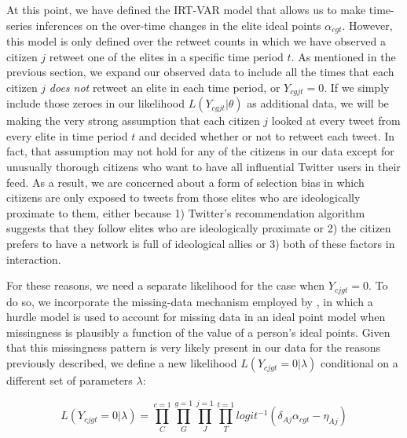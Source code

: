 \documentclass[12pt]{article}
\begin{document}
At this point, we have defined the IRT-VAR model that allows us to make time-series inferences on the over-time changes in the elite ideal points $\alpha_{cgt}$. However, this model is only defined over the retweet counts in which we have observed a citizen $j$ retweet one of the elites in a specific time period $t$. As mentioned in the previous section, we expand our observed data to include all the times that each citizen $j$ \emph{does not} retweet an elite in each time period, or $Y_{cgjt}=0$. If we simply include those zeroes in our likelihood $L(Y_{cgjt}|\theta)$ as additional data, we will be making the very strong assumption that each citizen $j$ looked at every tweet from every elite in time period $t$ and decided whether or not to retweet each tweet. In fact, that assumption may not hold for any of the citizens in our data except for unusually thorough citizens who want to have all influential Twitter users in their feed. As a result, we are concerned about a form of selection bias in which citizens are only exposed to tweets from those elites who are ideologically proximate to them, either because 1) Twitter's recommendation algorithm suggests that they follow elites who are ideologically proximate or 2) the citizen prefers to have a network is full of ideological allies or 3) both of these factors in interaction. 

For these reasons, we need a separate likelihood for the case when $Y_{cjgt}=0$. To do so, we incorporate the missing-data mechanism employed by \textcite{kubinec2017}, in which a hurdle model is used to account for missing data in an ideal point model when missingness is plausibly a function of the value of a person's ideal points. Given that this missingness pattern is very likely present in our data for the reasons previously described, we define a new likelihood $L(Y_{cjgt}=0|\lambda)$ conditional on a different set of parameters $\lambda$:

\begin{equation}
	L(Y_{cjgt}=0|\lambda) = \prod^{c=1}_C \prod^{g=1}_G \prod^{j=1}_J  \prod^{t=1}_T logit^{-1}(\delta_{Aj}  \alpha_{cgt} - \eta_{Aj})
\end{equation}
\end{document}
